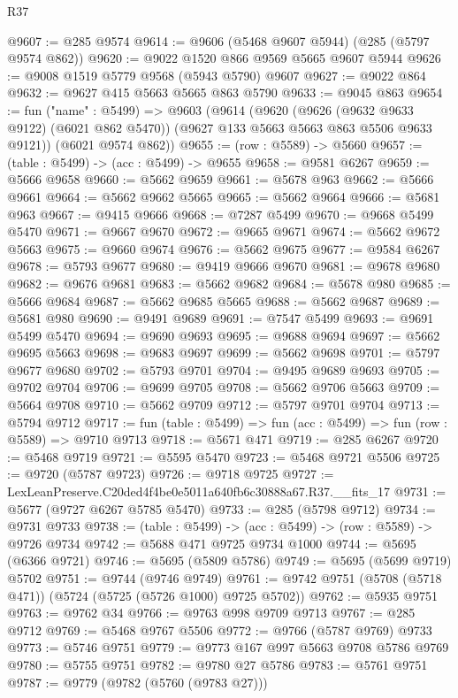 \begin{lexlean}{R37}
\begin{coremodule}
@9607 := @285 @9574
@9614 := @9606 (@5468 @9607 @5944) (@285 (@5797 @9574 @862))
@9620 := @9022 @1520 @866 @9569 @5665 @9607 @5944
@9626 := @9008 @1519 @5779 @9568 (@5943 @5790) @9607
@9627 := @9022 @864
@9632 := @9627 @415 @5663 @5665 @863 @5790
@9633 := @9045 @863
@9654 := fun ("name" : @5499) =>
  @9603
    (@9614
      (@9620
        (@9626 (@9632 @9633 @9122) (@6021 @862 @5470))
        (@9627 @133 @5663 @5663 @863 @5506 @9633 @9121))
      (@6021 @9574 @862))
@9655 := (row : @5589) -> @5660
@9657 := (table : @5499) -> (acc : @5499) -> @9655
@9658 := @9581 @6267
@9659 := @5666 @9658
@9660 := @5662 @9659
@9661 := @5678 @963
@9662 := @5666 @9661
@9664 := @5662 @9662 @5665
@9665 := @5662 @9664
@9666 := @5681 @963
@9667 := @9415 @9666
@9668 := @7287 @5499
@9670 := @9668 @5499 @5470
@9671 := @9667 @9670
@9672 := @9665 @9671
@9674 := @5662 @9672 @5663
@9675 := @9660 @9674
@9676 := @5662 @9675
@9677 := @9584 @6267
@9678 := @5793 @9677
@9680 := @9419 @9666 @9670
@9681 := @9678 @9680
@9682 := @9676 @9681
@9683 := @5662 @9682
@9684 := @5678 @980
@9685 := @5666 @9684
@9687 := @5662 @9685 @5665
@9688 := @5662 @9687
@9689 := @5681 @980
@9690 := @9491 @9689
@9691 := @7547 @5499
@9693 := @9691 @5499 @5470
@9694 := @9690 @9693
@9695 := @9688 @9694
@9697 := @5662 @9695 @5663
@9698 := @9683 @9697
@9699 := @5662 @9698
@9701 := @5797 @9677 @9680
@9702 := @5793 @9701
@9704 := @9495 @9689 @9693
@9705 := @9702 @9704
@9706 := @9699 @9705
@9708 := @5662 @9706 @5663
@9709 := @5664 @9708
@9710 := @5662 @9709
@9712 := @5797 @9701 @9704
@9713 := @5794 @9712
@9717 := fun (table : @5499) => fun (acc : @5499) => fun (row : @5589) => @9710 @9713
@9718 := @5671 @471
@9719 := @285 @6267
@9720 := @5468 @9719
@9721 := @5595 @5470
@9723 := @5468 @9721 @5506
@9725 := @9720 (@5787 @9723)
@9726 := @9718 @9725
@9727 := LexLeanPreserve.C20ded4f4be0e5011a640fb6c30888a67.R37.__fits_17
@9731 := @5677 (@9727 @6267 @5785 @5470)
@9733 := @285 (@5798 @9712)
@9734 := @9731 @9733
@9738 := (table : @5499) -> (acc : @5499) -> (row : @5589) -> @9726 @9734
@9742 := @5688 @471 @9725 @9734 @1000
@9744 := @5695 (@6366 @9721)
@9746 := @5695 (@5809 @5786)
@9749 := @5695 (@5699 @9719) @5702
@9751 := @9744 (@9746 @9749)
@9761 := @9742 @9751 (@5708 (@5718 @471)) (@5724 (@5725 (@5726 @1000) @9725 @5702))
@9762 := @5935 @9751
@9763 := @9762 @34
@9766 := @9763 @998 @9709 @9713
@9767 := @285 @9712
@9769 := @5468 @9767 @5506
@9772 := @9766 (@5787 @9769) @9733
@9773 := @5746 @9751
@9779 := @9773 @167 @997 @5663 @9708 @5786 @9769
@9780 := @5755 @9751
@9782 := @9780 @27 @5786
@9783 := @5761 @9751
@9787 := @9779 (@9782 (@5760 (@9783 @27)))

\end{coremodule}
\end{lexlean}
